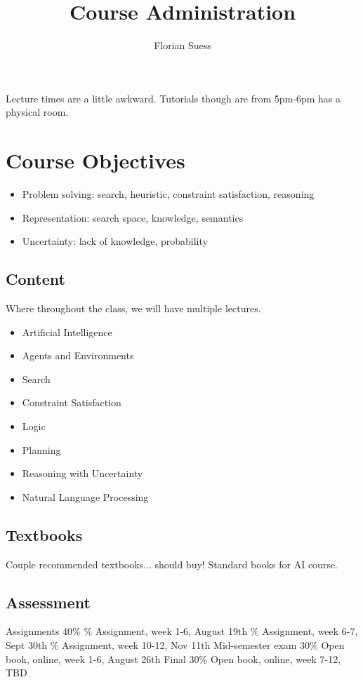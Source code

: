 \documentclass{article}
\begin{document}
\title{Course Administration}
\date{}
\author{Florian Suess}

\maketitle

Lecture times are a little awkward. Tutorials though are from 5pm-6pm has a physical room.

\section{Course Objectives}
\begin{itemize}
				\item Problem solving: search, heuristic, constraint satisfaction, reasoning
				\item Representation: search space, knowledge, semantics 
				\item Uncertainty: lack of knowledge, probability
\end{itemize}

\subsection{Content}
Where throughout the class, we will have multiple lectures.
\begin{itemize}
				\item Artificial Intelligence
				\item Agents and Environments
				\item Search
				\item Constraint Satisfaction
				\item Logic
				\item Planning
				\item Reasoning with Uncertainty
				\item Natural Language Processing
\end{itemize}

\subsection*{Textbooks}
Couple recommended textbooks... should buy! Standard books for AI course.

\subsection*{Assessment}
\begin{outline}
				\1 Assignments 40\%
								\% Assignment, week 1-6, August 19th
								\% Assignment, week 6-7, Sept 30th
								\% Assignment, week 10-12, Nov 11th
				\1 Mid-semester exam 30\%
								\2 Open book, online, week 1-6, August 26th
				\1 Final 30\%
								\2 Open book, online, week 7-12, TBD
\end{outline}
\end{document}
